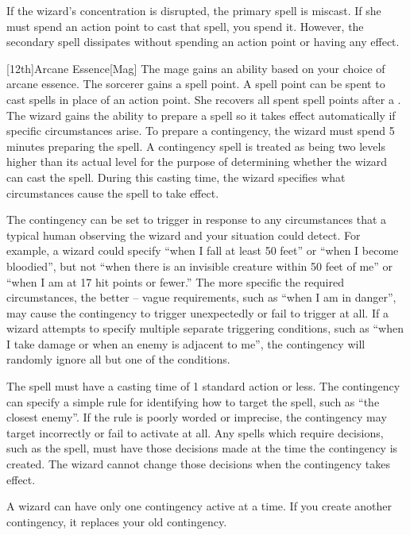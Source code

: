         If the wizard's concentration is disrupted, the primary spell is miscast.
        If she must spend an action point to cast that spell, you spend it.
        However, the secondary spell dissipates without spending an action point or having any effect.

        [12th]{Arcane Essence}[Mag]
        The mage gains an ability based on your choice of arcane essence.
         The sorcerer gains a spell point.
        A spell point can be spent to cast spells in place of an action point.
        She recovers all spent spell points after a .
         The wizard gains the ability to prepare a spell so it takes effect automatically if specific circumstances arise.
        To prepare a contingency, the wizard must spend 5 minutes preparing the spell.
        A contingency spell is treated as being two levels higher than its actual level for the purpose of determining whether the wizard can cast the spell.
        During this casting time, the wizard specifies what circumstances cause the spell to take effect.

        The contingency can be set to trigger in response to any circumstances that a typical human observing the wizard and your situation could detect.
        For example, a wizard could specify ``when I fall at least 50 feet'' or ``when I become bloodied'', but not ``when there is an invisible creature within 50 feet of me'' or ``when I am at 17 hit points or fewer.'' The more specific the required circumstances, the better -- vague requirements, such as ``when I am in danger'', may cause the contingency to trigger unexpectedly or fail to trigger at all.
        If a wizard attempts to specify multiple separate triggering conditions, such as ``when I take damage or when an enemy is adjacent to me'', the contingency will randomly ignore all but one of the conditions.

        The spell must have a casting time of 1 standard action or less.
        The contingency can specify a simple rule for identifying how to target the spell, such as ``the closest enemy''.
        If the rule is poorly worded or imprecise, the contingency may target incorrectly or fail to activate at all.
        Any spells which require decisions, such as the  spell, must have those decisions made at the time the contingency is created.
        The wizard cannot change those decisions when the contingency takes effect.

        A wizard can have only one contingency active at a time.
        If you create another contingency, it replaces your old contingency.

